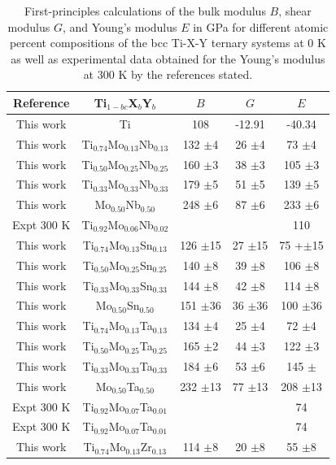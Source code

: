\newpage
\begin{longtable}[H]{ c c c c c }
	\caption{First-principles calculations of the bulk modulus $B$, shear modulus $G$, and Young's modulus $E$ in GPa for different atomic percent compositions of the bcc Ti-X-Y ternary systems at 0 K as well as experimental data obtained for the Young's modulus at 300 K by the references stated.} 	\label{Ch6-table:tixyelasdata} \\
	\hline
	Reference & Ti$_{1-bc}$X$_b$Y$_b$ & $B$ &$G$ & $E$\\
	\hline
	\endhead
	\hline
	\endfoot
	This work & Ti & 108 & -12.91 & -40.34\\
	This work & Ti$_{0.74}$Mo$_{0.13}$Nb$_{0.13}$ & 132 $\pm$4 & 26 $\pm$4 & 73 $\pm$4\\
	This work & Ti$_{0.50}$Mo$_{0.25}$Nb$_{0.25}$ & 160 $\pm$3 & 38 $\pm$3 & 105 $\pm$3\\
	This work & Ti$_{0.33}$Mo$_{0.33}$Nb$_{0.33}$ & 179 $\pm$5 & 51 $\pm$5 & 139 $\pm$5\\
	This work & Mo$_{0.50}$Nb$_{0.50}$ & 248 $\pm$6 & 87 $\pm$6 & 233 $\pm$6\\
	Expt 300 K \cite{Niinomi2012} & Ti$_{0.92}$Mo$_{0.06}$Nb$_{0.02}$ & & & 110\\
	This work & Ti$_{0.74}$Mo$_{0.13}$Sn$_{0.13}$ & 126 $\pm$15 & 27 $\pm$15 & 75 +$\pm$15\\
	This work & Ti$_{0.50}$Mo$_{0.25}$Sn$_{0.25}$ & 140 $\pm$8 & 39 $\pm$8 & 106 $\pm$8\\
	This work & Ti$_{0.33}$Mo$_{0.33}$Sn$_{0.33}$ & 144 $\pm$8 & 42 $\pm$8 & 114 $\pm$8\\
	This work & Mo$_{0.50}$Sn$_{0.50}$ & 151 $\pm$36 & 36 $\pm$36 & 100 $\pm$36\\
	This work & Ti$_{0.74}$Mo$_{0.13}$Ta$_{0.13}$ & 134 $\pm$4 & 25 $\pm$4 & 72 $\pm$4\\
	This work & Ti$_{0.50}$Mo$_{0.25}$Ta$_{0.25}$ & 165 $\pm$2 & 44 $\pm$3 & 122 $\pm$3\\
	This work & Ti$_{0.33}$Mo$_{0.33}$Ta$_{0.33}$ & 184 $\pm$6 & 53 $\pm$6 & 145 $\pm$\\
	This work & Mo$_{0.50}$Ta$_{0.50}$ & 232 $\pm$13 & 77 $\pm$13 & 208 $\pm$13\\
	Expt 300 K \cite{Mohammed2014} & Ti$_{0.92}$Mo$_{0.07}$Ta$_{0.01}$ & & & 74\\
	Expt 300 K \cite{Niinomi2012}  & Ti$_{0.92}$Mo$_{0.07}$Ta$_{0.01}$ & & & 74\\
	This work & Ti$_{0.74}$Mo$_{0.13}$Zr$_{0.13}$ & 114 $\pm$8 & 20 $\pm$8 & 55 $\pm$8\\

\end{longtable}

